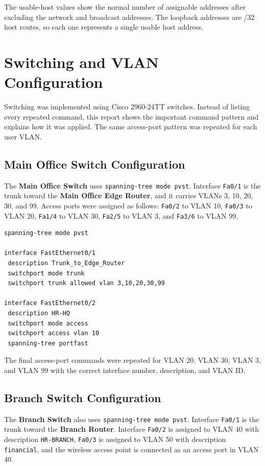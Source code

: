 \documentclass[12pt,a4paper]{article}
\begin{document}
The usable-host values show the normal number of assignable addresses after excluding the network and broadcast addresses. The loopback addresses are /32 host routes, so each one represents a single usable host address.

\section{Switching and VLAN Configuration}

Switching was implemented using Cisco 2960-24TT switches. Instead of listing every repeated command, this report shows the important command pattern and explains how it was applied. The same access-port pattern was repeated for each user VLAN.

\subsection{Main Office Switch Configuration}

The \textbf{Main Office Switch} uses \texttt{spanning-tree mode pvst}. Interface \texttt{Fa0/1} is the trunk toward the \textbf{Main Office Edge Router}, and it carries VLANs 3, 10, 20, 30, and 99. Access ports were assigned as follows: \texttt{Fa0/2} to VLAN 10, \texttt{Fa0/3} to VLAN 20, \texttt{Fa1/4} to VLAN 30, \texttt{Fa2/5} to VLAN 3, and \texttt{Fa3/6} to VLAN 99.

\begin{lstlisting}[caption={Simplified main office switch command pattern.}]
spanning-tree mode pvst

interface FastEthernet0/1
 description Trunk_to_Edge_Router
 switchport mode trunk
 switchport trunk allowed vlan 3,10,20,30,99

interface FastEthernet0/2
 description HR-HQ
 switchport mode access
 switchport access vlan 10
 spanning-tree portfast
\end{lstlisting}

The final access-port commands were repeated for VLAN 20, VLAN 30, VLAN 3, and VLAN 99 with the correct interface number, description, and VLAN ID.

\subsection{Branch Switch Configuration}

The \textbf{Branch Switch} also uses \texttt{spanning-tree mode pvst}. Interface \texttt{Fa0/1} is the trunk toward the \textbf{Branch Router}. Interface \texttt{Fa0/2} is assigned to VLAN 40 with description \texttt{HR-BRANCH}, \texttt{Fa0/3} is assigned to VLAN 50 with description \texttt{financial}, and the wireless access point is connected as an access port in VLAN 40.
\end{document}
